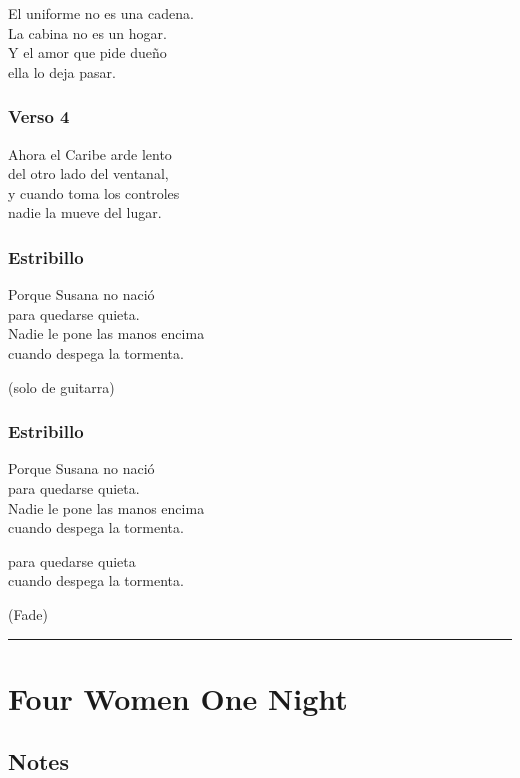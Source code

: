 El uniforme no es una cadena.\\
La cabina no es un hogar.\\
Y el amor que pide dueño\\
ella lo deja pasar.

\subsubsection{Verso 4}\label{verso-4}

Ahora el Caribe arde lento\\
del otro lado del ventanal,\\
y cuando toma los controles\\
nadie la mueve del lugar.

\subsubsection{Estribillo}\label{estribillo-2}

Porque Susana no nació\\
para quedarse quieta.\\
Nadie le pone las manos encima\\
cuando despega la tormenta.

(solo de guitarra)

\subsubsection{Estribillo}\label{estribillo-3}

Porque Susana no nació\\
para quedarse quieta.\\
Nadie le pone las manos encima\\
cuando despega la tormenta.

para quedarse quieta\\
cuando despega la tormenta.

(Fade)

\begin{center}\rule{0.5\linewidth}{0.5pt}\end{center}

\section{Four Women One Night}\label{four-women-one-night}

\subsection{Notes}\label{notes-5}

